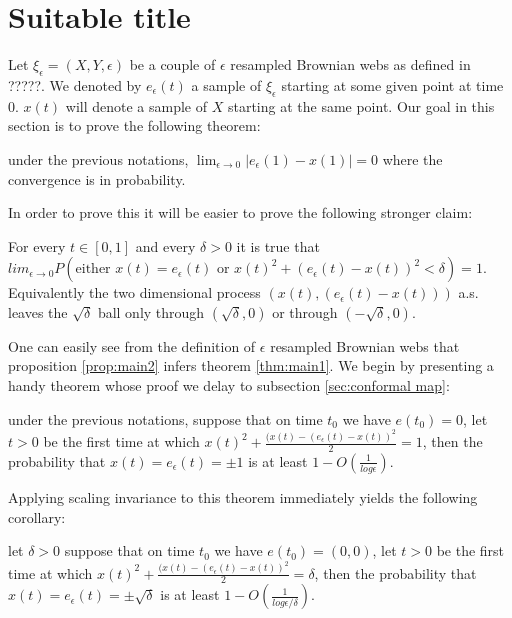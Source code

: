 {
\section{Suitable title}
Let $\xi_\epsilon=(X,Y,\epsilon)$ be a couple of $\epsilon$ resampled
Brownian webs as defined in ?????. We denoted by $e_\epsilon(t)$ a
sample of $\xi_\epsilon$ starting at some given point at time
$0$. $x(t)$ will denote a sample of $X$ starting at the same
point. Our goal in this section is to prove the following theorem:

\begin{theorem}\label{thm:main1}
under the previous notations, $\lim_{\epsilon \rightarrow 0}
|e_\epsilon(1)- x(1)| = 0$ where the convergence is in probability.
\end{theorem}

In order to prove this it will be easier to prove the following
stronger claim:
\begin{propos}\label{prop:main2}
For every $t\in[0,1]$ and every $\delta>0$ it is true that
$lim_{\epsilon \rightarrow 0}P\left(\text{either } x(t)=e_\epsilon(t)
\text{ or }
x(t)^2+(e_\epsilon(t)-x(t))^2<\delta\right)=1$. Equivalently the two
dimensional process $(x(t),(e_\epsilon(t)-x(t)))$ a.s. leaves the
$\sqrt\delta$ ball only through $(\sqrt\delta,0)$ or through
$(-\sqrt\delta,0)$.
\end{propos}

One can easily see from the definition of $\epsilon$ resampled
Brownian webs that proposition \ref{prop:main2} infers theorem
\ref{thm:main1}.  We begin by presenting a handy theorem whose proof
we delay to subsection \ref{sec:conformal map}:

\begin{theorem}\label{thm:no-escape}
under the previous notations, suppose that on time $t_0$ we have
$e(t_0)=0$, let $t>0$ be the first time at which
$x(t)^2+\frac{(x(t)-(e_\epsilon(t)-x(t))^2}2=1$, then the probability
that $x(t)=e_\epsilon(t)=\pm1$ is at least $1-O(\frac1{log\epsilon})$.
\end{theorem}

Applying scaling invariance to this theorem immediately yields the
following corollary:
\begin{cor}\label{cor:cor0}
let $\delta>0$ suppose that on time $t_0$ we have $e(t_0)=(0,0)$, let
$t>0$ be the first time at which
$x(t)^2+\frac{(x(t)-(e_\epsilon(t)-x(t))^2}2=\delta$, then the
probability that $x(t)=e_\epsilon(t)=\pm\sqrt\delta$ is at least
$1-O(\frac{1}{log\epsilon/\delta})$.
\end{cor}

}
